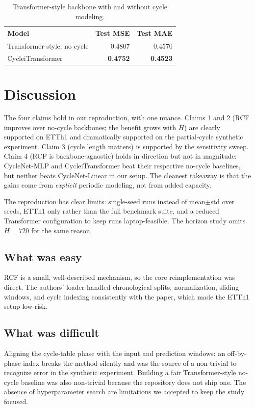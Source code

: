 \documentclass[10pt]{article}
\begin{document}
\begin{table}[h]
\centering
\caption{Transformer-style backbone with and without cycle modeling.}
\label{tab:itransformer}
\begin{tabular}{lrr}
\toprule
Model & Test MSE & Test MAE \\
\midrule
Transformer-style, no cycle & 0.4807 & 0.4570 \\
CycleiTransformer           & \textbf{0.4752} & \textbf{0.4523} \\
\bottomrule
\end{tabular}
\end{table}

\section{Discussion}
\label{sec:discussion}

The four claims hold in our reproduction, with one nuance. Claims 1 and 2 (RCF improves over no-cycle backbones; the benefit grows with $H$) are clearly supported on ETTh1 and dramatically supported on the partial-cycle synthetic experiment. Claim 3 (cycle length matters) is supported by the sensitivity sweep. Claim 4 (RCF is backbone-agnostic) holds in direction but not in magnitude: CycleNet-MLP and CycleiTransformer beat their respective no-cycle baselines, but neither beats CycleNet-Linear in our setup. The cleanest takeaway is that the gains come from \emph{explicit} periodic modeling, not from added capacity.

The reproduction has clear limits: single-seed runs instead of mean$\pm$std over seeds, ETTh1 only rather than the full benchmark suite, and a reduced Transformer configuration to keep runs laptop-feasible. The horizon study omits $H{=}720$ for the same reason.

\subsection{What was easy}
RCF is a small, well-described mechanism, so the core reimplementation was direct. The authors' loader handled chronological splits, normalization, sliding windows, and cycle indexing consistently with the paper, which made the ETTh1 setup low-risk.

\subsection{What was difficult}
Aligning the cycle-table phase with the input and prediction windows: an off-by-phase index breaks the method silently and was the source of a non trivial to recognize error in the synthetic experiment. Building a fair Transformer-style no-cycle baseline was also non-trivial because the repository does not ship one. The absence of hyperparameter search are limitations we accepted to keep the study focused.
\end{document}
